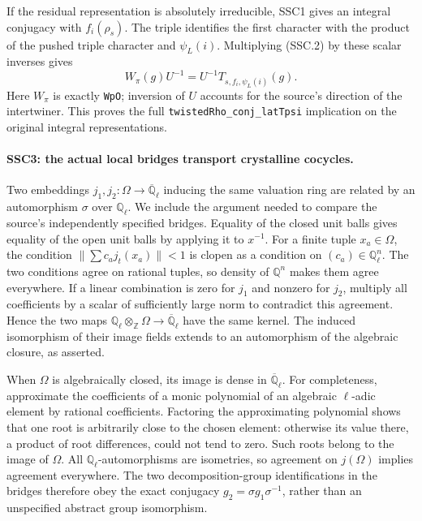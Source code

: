 \documentclass[11pt,a4paper]{article}
\numberwithin{equation}{section}
\theoremstyle{remark}\newtheorem{remark}[theorem]{Remark}
\begin{document}
If the residual representation is absolutely irreducible, SSC1
gives an integral conjugacy with $f_i(\rho_s)$. The triple identifies
the first character with the product of the pushed triple character
and $\psi_L(i)$. Multiplying (SSC.2) by these scalar inverses gives
\[
 W_{\pi}(g)U^{-1}
     =U^{-1}T_{s,f_i,\psi_L(i)}(g).                            \tag{SSC.6}
\]
Here $W_\pi$ is exactly \texttt{Wp\allowbreak O}; inversion of $U$ accounts for
the source's direction of the intertwiner. This proves the full
\texttt{twisted\allowbreak Rho\_\allowbreak conj\_\allowbreak lat\allowbreak Tpsi} implication on the original
integral representations.

\paragraph{SSC3: the actual local bridges transport crystalline cocycles.}
\label{claim:SSC3}
Two embeddings $j_1,j_2:\Omega\to\overline{\mathbb Q}_\ell$
inducing the same valuation ring are related by an automorphism
$\sigma$ over $\mathbb Q_\ell$. We include the argument needed
to compare the source's independently specified bridges. Equality
of the closed unit balls gives equality of the open unit balls by
applying it to $x^{-1}$. For a finite tuple $x_a\in\Omega$,
the condition
$\|\sum c_a j_t(x_a)\|<1$ is clopen as a condition on
$(c_a)\in\mathbb Q_\ell^n$. The two conditions agree on rational
tuples, so density of $\mathbb Q^n$ makes them agree everywhere.
If a linear combination is zero for $j_1$ and nonzero for $j_2$,
multiply all coefficients by a scalar of sufficiently large norm
to contradict this agreement. Hence the two maps
$\mathbb Q_\ell\otimes_{\mathbb Z}\Omega\to
\overline{\mathbb Q}_\ell$ have the same kernel. The induced
isomorphism of their image fields extends to an automorphism of
the algebraic closure, as asserted.

When $\Omega$ is algebraically closed, its image is dense in
$\overline{\mathbb Q}_\ell$. For completeness, approximate the
coefficients of a monic polynomial of an algebraic $\ell$-adic
element by rational coefficients. Factoring the approximating
polynomial shows that one root is arbitrarily close to the chosen
element: otherwise its value there, a product of root differences,
could not tend to zero. Such roots belong to the image of
$\Omega$. All $\mathbb Q_\ell$-automorphisms are isometries, so
agreement on $j(\Omega)$ implies agreement everywhere. The two
decomposition-group identifications in the bridges therefore obey
the exact conjugacy
$g_2=\sigma g_1\sigma^{-1}$, rather than an unspecified
abstract group isomorphism.
\end{document}
